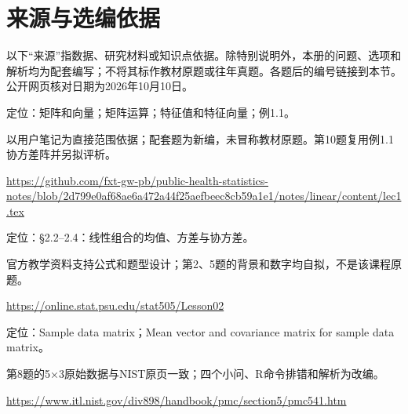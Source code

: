 \chapter*{来源与选编依据}
以下“来源”指数据、研究材料或知识点依据。除特别说明外，本册的问题、选项和解析均为配套编写；不将其标作教材原题或往年真题。各题后的编号链接到本节。公开网页核对日期为2026年10月10日。

\par\noindent\begin{minipage}{\linewidth}\label{src:NOTE-L1}
\par
定位：矩阵和向量；矩阵运算；特征值和特征向量；例1.1。\par
以用户笔记为直接范围依据；配套题为新编，未冒称教材原题。第10题复用例1.1协方差阵并另拟评析。\par
{\small\url{https://github.com/fxt-gw-pb/public-health-statistics-notes/blob/2d799e0af68ae6a472a44f25aefbeec8cb59a1e1/notes/linear/content/lec1.tex}}\par
\end{minipage}\par\medskip

\par\noindent\begin{minipage}{\linewidth}\label{src:PSU-LC}
\par
定位：§2.2–2.4：线性组合的均值、方差与协方差。\par
官方教学资料支持公式和题型设计；第2、5题的背景和数字均自拟，不是该课程原题。\par
{\small\url{https://online.stat.psu.edu/stat505/Lesson02}}\par
\end{minipage}\par\medskip

\par\noindent\begin{minipage}{\linewidth}\label{src:NIST-MATRIX}
\par
定位：Sample data matrix；Mean vector and covariance matrix for sample data matrix。\par
第8题的5×3原始数据与NIST原页一致；四个小问、R命令排错和解析为改编。\par
{\small\url{https://www.itl.nist.gov/div898/handbook/pmc/section5/pmc541.htm}}\par
\end{minipage}\par\medskip

